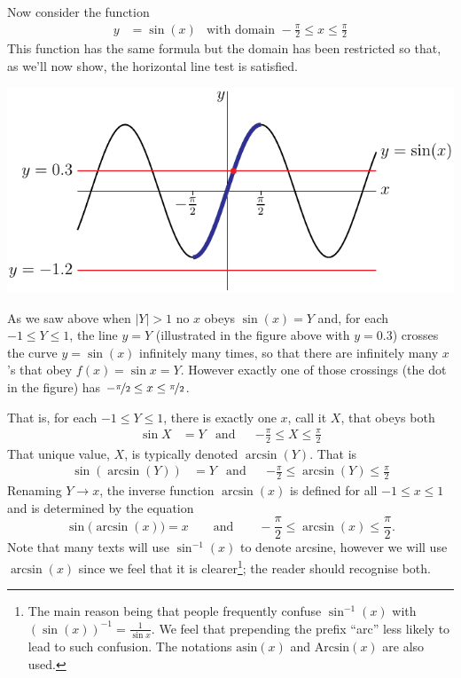 \begin{eg}
Now consider the function
\begin{align*}
  y &= \sin(x) & \text{with domain } -\frac{\pi}{2} \leq x \leq \frac{\pi}{2}
\end{align*}
This function has the same formula but the domain has been restricted so that, as we'll
now show, the horizontal line test is satisfied.
\begin{efig}
\begin{center}
  \includegraphics{sinInvB}
\end{center}
\end{efig}
As we saw above when $|Y|>1$ no $x$ obeys $\sin(x)=Y$ and, for each $-1\le Y\le 1$,
the line $y=Y$ (illustrated in the figure above with $y=0.3$) crosses the
curve $y=\sin(x)$ infinitely many times, so that there are infinitely
many $x$'s that obey $f(x)=\sin x=Y$. However exactly one of those crossings
(the dot in the figure) has $-\nicefrac{\pi}{2}\le x \le\nicefrac{\pi}{2}$.

That is, for each $-1\le Y \le 1$, there is exactly one $x$, call it $X$, that obeys both
\begin{align*}
      \sin X &= Y &\text{and} && -\frac{\pi}{2}\le X \le \frac{\pi}{2}
\end{align*}
That unique value, $X$, is typically denoted $\arcsin(Y)$. That is
\begin{align*}
  \sin( \arcsin(Y) ) &= Y & \text{and} && -\frac{\pi}{2}\le \arcsin(Y) \le\frac{\pi}{2}
\end{align*}
Renaming $Y\rightarrow x$, the inverse function $\arcsin(x)$ is
defined for all $-1 \le x \le 1$ and is determined by the
equation
\begin{equation}\label{eq:DIFFarcsin}
\sin\big(\arcsin(x)\big)=x\qquad\text{and}\qquad
        -\frac{\pi}{2}\le \arcsin(x)\le\frac{\pi}{2}.
\end{equation}
Note that many texts will use $\sin^{-1}(x)$ to denote arcsine, however we will use
$\arcsin(x)$ since we feel that it is clearer\footnote{The main reason being that people
frequently confuse $\sin^{-1}(x)$ with $(\sin(x))^{-1} = \frac{1}{\sin x}$. We feel that
prepending the prefix ``arc'' less likely to lead to such confusion. The notations
$\textrm{asin}(x)$ and $\textrm{Arcsin}(x)$ are also used.}; the reader should recognise
both.


\end{eg}


